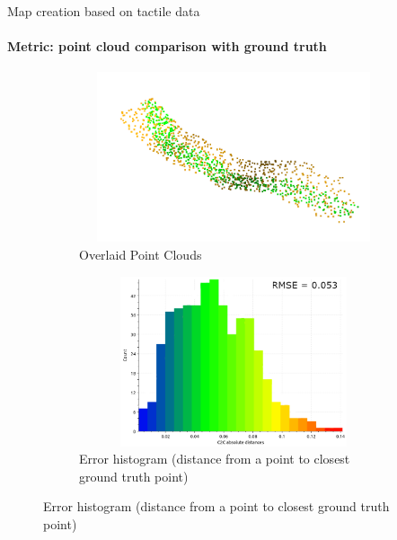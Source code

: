 \documentclass[aspectratio=169,xcolor=table]{beamer}
\begin{document}
\begin{frame}[t]{Map creation based on tactile data}
    \framesubtitle{Metric: point cloud comparison with ground truth}
    \vspace{-15pt}
    \begin{figure}[H]
        \begin{subfigure}[t]{0.49\textwidth}
            \centering\includegraphics[height=5cm,width=1\textwidth,keepaspectratio]{cropped_pcd.png}
            \caption*{Overlaid Point Clouds}
        \end{subfigure}
        \begin{subfigure}[t]{0.49\textwidth}
            \centering\includegraphics[height=5cm,width=1\textwidth,keepaspectratio]{pcd_hist.png}
            \caption*{Error histogram (distance from a point to closest ground truth point)}
        \end{subfigure}
    \end{figure}
\end{frame}
\end{document}
